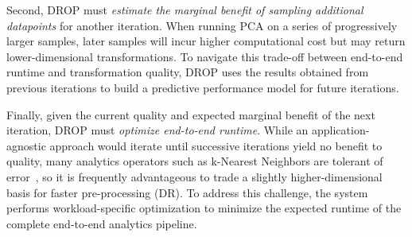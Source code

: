 Second, DROP must \emph{estimate the marginal benefit of sampling additional datapoints} for another iteration.
When running PCA on a series of progressively larger samples, later samples will incur higher computational cost but may return lower-dimensional transformations. 
To navigate this trade-off between end-to-end runtime and transformation quality, DROP uses the results obtained from previous iterations to build a predictive performance model for future iterations.


Finally, given the current quality and expected marginal benefit of the next iteration, DROP must \emph{optimize end-to-end runtime}.
While an application-agnostic approach would iterate until successive iterations yield no benefit to quality, many analytics operators such as k-Nearest Neighbors are tolerant of error~\cite{gemini}, so it is frequently advantageous to trade a slightly higher-dimensional basis for faster pre-processing (DR).
To address this challenge, the system performs workload-specific optimization to minimize the expected runtime of the complete end-to-end analytics pipeline.


